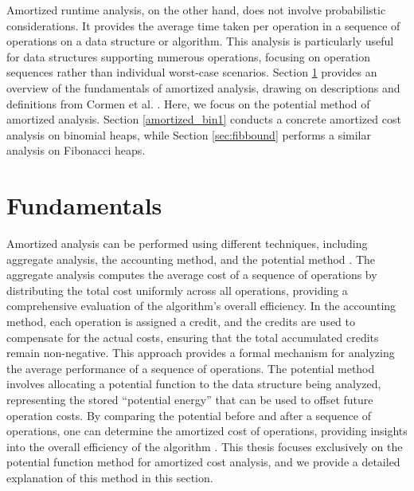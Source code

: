\documentclass{clmthesis}
\begin{document}
Amortized runtime analysis, on the other hand, does not involve probabilistic considerations. It provides the average time taken per operation in a sequence of operations on a data structure or algorithm. This analysis is particularly useful for data structures supporting numerous operations, focusing on operation sequences rather than individual worst-case scenarios. Section \ref{fundamentals} provides an overview of the fundamentals of amortized analysis, drawing on descriptions and definitions from Cormen et al. \cite{thomas2022}. Here, we focus on the potential method of amortized analysis. Section \ref{amortized_bin1} conducts a concrete amortized cost analysis on binomial heaps, while Section \ref{sec:fibbound} performs a similar analysis on Fibonacci heaps.

\section{Fundamentals} \label{fundamentals}


Amortized analysis can be performed using different techniques, including aggregate analysis, the accounting method, and the potential method \cite{sadagopanAm}.
The aggregate analysis computes the average cost of a sequence of operations by distributing the total cost uniformly across all operations, providing a comprehensive evaluation of the algorithm's overall efficiency.
In the accounting method, each operation is assigned a credit, and the credits are used to compensate for the actual costs, ensuring that the total accumulated credits remain non-negative. This approach provides a formal mechanism for analyzing the average performance of a sequence of operations.
The potential method involves allocating a potential function to the data structure being analyzed, representing the stored \enquote{potential energy} that can be used to offset future operation costs. By comparing the potential before and after a sequence of operations, one can determine the amortized cost of operations, providing insights into the overall efficiency of the algorithm \cite{sadagopanAm}.
This thesis focuses exclusively on the potential function method for amortized cost analysis, and we provide a detailed explanation of this method in this section.

\end{document}
